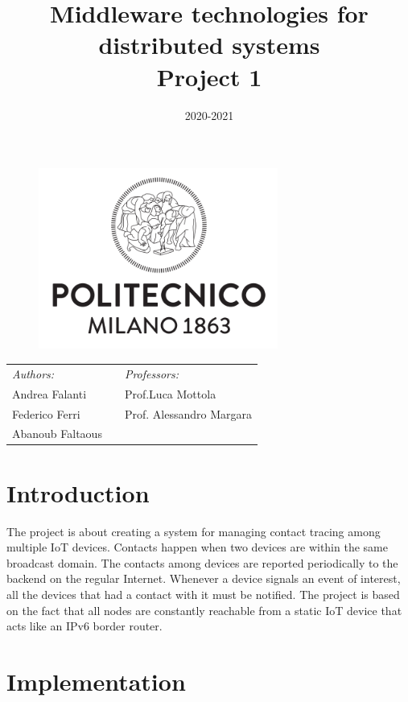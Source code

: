 \documentclass[10pt]{article}
\title{Middleware technologies for distributed systems\\Project 1}
\date{2020-2021}
\begin{document}
	\begin{titlepage}
		\begin{figure}[t]
			\centering\includegraphics[width=0.7\textwidth]{../../docResources/logo_polimi}
		\end{figure}
		\maketitle
		
		\large
		\begin{tabularx}{\linewidth}{@{}lXl@{}}
			\textit{Authors:}  & & \textit{Professors:} \\
			Andrea Falanti      & & Prof.\@ Luca Mottola\\
			Federico Ferri  & & Prof. Alessandro Margara\\
			Abanoub Faltaous & & \\
		\end{tabularx}		
		\thispagestyle{empty}
	\end{titlepage}
	
	\tableofcontents
	\newpage
	
	\section{Introduction}
	The project is about creating a system for managing contact tracing among multiple IoT devices. Contacts happen when two devices are within the same broadcast domain. The contacts among devices are reported periodically to the backend on the regular Internet. Whenever a device signals an event of interest, all the devices that had a contact with it must be notified. The project is based on the fact that all nodes are constantly reachable from a static IoT device that acts like an IPv6 border router.   
	
	
	\section{Implementation}
\end{document}
